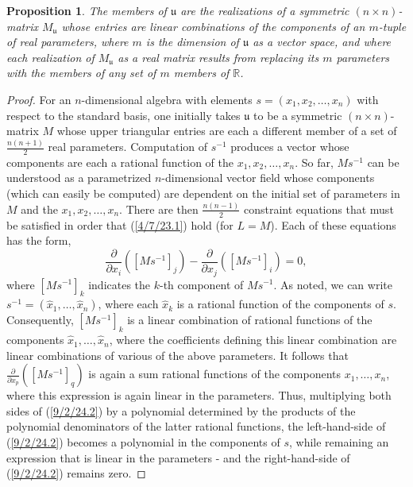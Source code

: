 \documentclass{amsart}
\numberwithin{equation}{section}
\newtheorem{proposition}[theorem]{Proposition}
\theoremstyle{definition}
\numberwithin{theorem}{section}
\begin{document}
\begin{proposition}\label{9/2/24.1} The members of $\mathfrak{u}$ are the realizations of a symmetric $(n\times n)$-matrix $M_{\mathfrak{u}}$ whose entries are linear combinations of the components of an $m$-tuple of real parameters, where $m$ is the dimension of $\mathfrak{u}$ as a vector space, and where each realization of $M_{\mathfrak{u}}$ as a real matrix results from replacing its $m$ parameters with the members of any set of $m$ members of $\mathbb{R}$.   
\end{proposition}

\begin{proof} For an $n$-dimensional algebra with elements $s = (x_1,x_2,\dots,x_n)$ with respect to the standard basis, one initially takes $\mathfrak{u}$ to be a symmetric $(n\times n)$-matrix $M$ whose upper triangular entries are each a different member of a set of $\frac{n(n+1)}{2}$ real parameters.  Computation of $s^{-1}$ produces a vector whose components are each a rational function of the $x_1,x_2,\dots,x_n$.  So far, $Ms^{-1}$ can be understood as a parametrized \mbox{$n$-dimensional} vector field whose components (which can easily be computed) are dependent on the initial set of parameters in $M$ and the $x_1,x_2,\dots,x_n$.  There are then $\frac{n(n-1)}{2}$ constraint equations that must be satisfied in order that (\ref{4/7/23.1}) hold (for $L=M$).  Each of these equations has the form, \begin{equation}\label{9/2/24.2} \frac{\partial}{\partial x_i}([Ms^{-1}]_j) - \frac{\partial}{\partial x_j}([Ms^{-1}]_i) = 0,\end{equation} where $[Ms^{-1}]_k$ indicates the $k$-th component of $Ms^{-1}$.  As noted, we can write $s^{-1} = (\hat{x}_1,\dots,\hat{x}_n)$, where each $\hat{x}_k$ is a rational function of the components of $s$.  Consequently, $[Ms^{-1}]_k$ is a linear combination of rational functions of the components $\hat{x}_1,\dots,\hat{x}_n$, where the coefficients defining this linear combination are linear combinations of various of the above parameters.  It follows that $\frac{\partial}{\partial x_p}([Ms^{-1}]_q)$ is again a sum rational functions of the components $x_1,\dots,x_n$, where this expression is again linear in the parameters.  Thus, multiplying both sides of (\ref{9/2/24.2}) by a polynomial determined by the products of the polynomial denominators of the latter rational functions, the left-hand-side of (\ref{9/2/24.2}) becomes a polynomial in the components of $s$, while remaining an expression that is linear in the parameters - and the right-hand-side of (\ref{9/2/24.2}) remains zero.

\end{proof}
\end{document}
